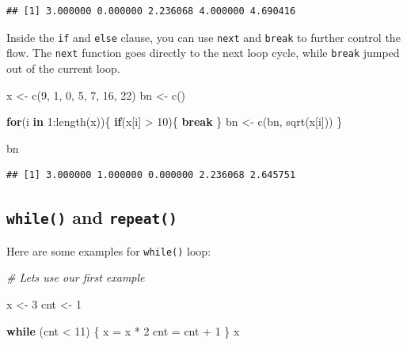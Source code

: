 \documentclass[
]{book}
\newenvironment{Shaded}{\begin{snugshade}}{\end{snugshade}}
\newcommand{\CommentTok}[1]{\textcolor[rgb]{0.56,0.35,0.01}{\textit{#1}}}
\newcommand{\ControlFlowTok}[1]{\textcolor[rgb]{0.13,0.29,0.53}{\textbf{#1}}}
\newcommand{\DecValTok}[1]{\textcolor[rgb]{0.00,0.00,0.81}{#1}}
\newcommand{\FunctionTok}[1]{\textcolor[rgb]{0.00,0.00,0.00}{#1}}
\newcommand{\NormalTok}[1]{#1}
\newcommand{\OtherTok}[1]{\textcolor[rgb]{0.56,0.35,0.01}{#1}}
\newcommand{\SpecialCharTok}[1]{\textcolor[rgb]{0.00,0.00,0.00}{#1}}
\begin{document}
\begin{verbatim}
## [1] 3.000000 0.000000 2.236068 4.000000 4.690416
\end{verbatim}

Inside the \texttt{if} and \texttt{else} clause, you can use \texttt{next} and \texttt{break} to further control the flow. The \texttt{next} function goes directly to the next loop cycle, while \texttt{break} jumped out of the current loop.

\begin{Shaded}
\begin{Highlighting}[]
\NormalTok{x }\OtherTok{\textless{}{-}} \FunctionTok{c}\NormalTok{(}\DecValTok{9}\NormalTok{, }\DecValTok{1}\NormalTok{, }\DecValTok{0}\NormalTok{, }\DecValTok{5}\NormalTok{, }\DecValTok{7}\NormalTok{, }\DecValTok{16}\NormalTok{, }\DecValTok{22}\NormalTok{)}
\NormalTok{bn }\OtherTok{\textless{}{-}} \FunctionTok{c}\NormalTok{()}

\ControlFlowTok{for}\NormalTok{(i }\ControlFlowTok{in} \DecValTok{1}\SpecialCharTok{:}\FunctionTok{length}\NormalTok{(x))\{ }
  \ControlFlowTok{if}\NormalTok{(x[i] }\SpecialCharTok{\textgreater{}} \DecValTok{10}\NormalTok{)\{ }
    \ControlFlowTok{break}
\NormalTok{  \} }
\NormalTok{  bn }\OtherTok{\textless{}{-}} \FunctionTok{c}\NormalTok{(bn,  }\FunctionTok{sqrt}\NormalTok{(x[i]))}
\NormalTok{\}}

\NormalTok{bn}
\end{Highlighting}
\end{Shaded}

\begin{verbatim}
## [1] 3.000000 1.000000 0.000000 2.236068 2.645751
\end{verbatim}

\hypertarget{while-and-repeat}{%
\subsection{\texorpdfstring{\texttt{while()} and \texttt{repeat()}}{while() and repeat()}}\label{while-and-repeat}}

Here are some examples for \texttt{while()} loop:

\begin{Shaded}
\begin{Highlighting}[]
\CommentTok{\# Let\textquotesingle{}s use our first example}

\NormalTok{x }\OtherTok{\textless{}{-}} \DecValTok{3}
\NormalTok{cnt }\OtherTok{\textless{}{-}} \DecValTok{1}

\ControlFlowTok{while}\NormalTok{ (cnt }\SpecialCharTok{\textless{}} \DecValTok{11}\NormalTok{) \{}
\NormalTok{   x }\OtherTok{=}\NormalTok{ x }\SpecialCharTok{*} \DecValTok{2}
\NormalTok{   cnt }\OtherTok{=}\NormalTok{ cnt }\SpecialCharTok{+} \DecValTok{1}
\NormalTok{\}}
\NormalTok{x}
\end{Highlighting}
\end{Shaded}
\end{document}
